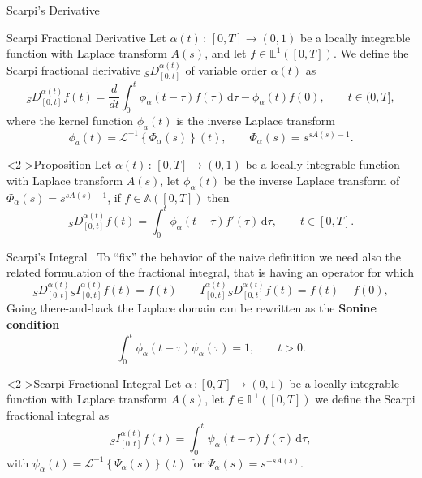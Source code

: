 \documentclass[aspectratio=169,xcolor=dvipsnames]{beamer}
\begin{document}
\begin{frame}{Scarpi's Derivative~{\Large\parencite{MR4268683}}}\vspace{-0.5em}

\begin{block}{Scarpi Fractional Derivative}
Let $\alpha(t)\,:\,[0,T] \rightarrow (0,1)$ be a locally integrable function with Laplace transform $A(s)$, and let $f \in \mathbb{L}^{1}([0,T])$. We define the Scarpi fractional derivative ${}_{S}D^{\alpha(t)}_{[0,t]}$ of variable order $\alpha(t)$ as\vspace{-0.5em}
\[
{}_{S}D^{\alpha(t)}_{[0,t]} f(t) = \frac{d}{d t} \int_{0}^{t} \phi_\alpha(t-\tau) f(\tau)\,\mathrm{d}\tau - \phi_\alpha(t)f(0), \qquad t \in (0,T],
\]
where the kernel function $\phi_a(t)$ is the inverse Laplace transform
\[
\phi_a(t) = \mathcal{L}^{-1} \left\lbrace \Phi_\alpha(s) \right\rbrace (t), \qquad \Phi_\alpha(s) = s^{s A(s) - 1}.
\]
\end{block}

\begin{alertblock}<2->{Proposition \parencite[Proposition~2.1]{MR4268683}}
Let $\alpha(t)\,:\,[0,T] \rightarrow (0,1)$ be a locally integrable function with Laplace transform $A(s)$, let $\phi_\alpha(t)$ be the inverse Laplace transform of $\Phi_\alpha(s) = s^{s A(s)-1}$, if $f \in \mathbb{A}([0,T])$ then\vspace{-1em}
\[
{}_{S}D^{\alpha(t)}_{[0,t]} f(t) = \int_{0}^{t} \phi_\alpha(t-\tau) f'(\tau)\,\mathrm{d}\tau, \qquad t \in [0,T].
\]
\end{alertblock}

\end{frame}

\begin{frame}{Scarpi's Integral~{\Large\parencite{MR4268683}}}
To ``fix'' the behavior of the naive definition we need also the related formulation of the fractional integral, that is having an operator for which
\[
{}_{S}D^{\alpha(t)}_{[0,t]} {}_{S}I^{\alpha(t)}_{[0,t]}f(t) = f(t) \qquad  I^{\alpha(t)}_{[0,t]}{}_{S}D^{\alpha(t)}_{[0,t]} f(t) = f(t)-f(0),
\]
Going there-and-back the Laplace domain can be rewritten as the \textbf{Sonine condition}\vspace{-0.5em}
\[
\int_{0}^{t} \phi_\alpha(t-\tau) \psi_\alpha(\tau) = 1, \qquad t > 0.
\]\vspace{-0.5em}
\begin{block}<2->{Scarpi Fractional Integral} 
Let $\alpha\,:[0,T]\rightarrow (0,1)$ be a locally integrable function with Laplace transform $A(s)$, let $f \in \mathbb{L}^1([0,T])$ we define the Scarpi fractional integral as\vspace{-0.5em}
\[
{}_{S}I^{\alpha(t)}_{[0,t]}f(t) = \int_{0}^{t} \psi_\alpha(t-\tau)f(\tau)\,\mathrm{d}\tau,
\]
with $\psi_\alpha(t) = \mathcal{L}^{-1}\left\lbrace \Psi_\alpha(s)\right\rbrace(t)$ for $\Psi_\alpha(s) = s^{-s A(s)}$.
\end{block}

\end{frame}
\end{document}
